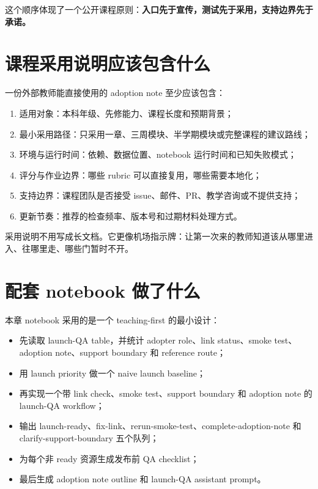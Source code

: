 这个顺序体现了一个公开课程原则：\textbf{入口先于宣传，测试先于采用，支持边界先于承诺。}

\section{课程采用说明应该包含什么}

一份外部教师能直接使用的 adoption note 至少应该包含：

\begin{enumerate}
    \item 适用对象：本科年级、先修能力、课程长度和预期背景；
    \item 最小采用路径：只采用一章、三周模块、半学期模块或完整课程的建议路线；
    \item 环境与运行时间：依赖、数据位置、notebook 运行时间和已知失败模式；
    \item 评分与作业边界：哪些 rubric 可以直接复用，哪些需要本地化；
    \item 支持边界：课程团队是否接受 issue、邮件、PR、教学咨询或不提供支持；
    \item 更新节奏：推荐的检查频率、版本号和过期材料处理方式。
\end{enumerate}

采用说明不用写成长文档。它更像机场指示牌：让第一次来的教师知道该从哪里进入、往哪里走、哪些门暂时不开。

\section{配套 notebook 做了什么}

本章 notebook 采用的是一个 teaching-first 的最小设计：

\begin{itemize}
    \item 先读取 launch-QA table，并统计 adopter role、link status、smoke test、adoption note、support boundary 和 reference route；
    \item 用 launch priority 做一个 naive launch baseline；
    \item 再实现一个带 link check、smoke test、support boundary 和 adoption note 的 launch-QA workflow；
    \item 输出 launch-ready、fix-link、rerun-smoke-test、complete-adoption-note 和 clarify-support-boundary 五个队列；
    \item 为每个非 ready 资源生成发布前 QA checklist；
    \item 最后生成 adoption note outline 和 launch-QA assistant prompt。
\end{itemize}

